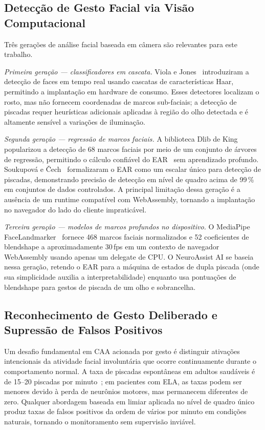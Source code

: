 \subsection{Detecção de Gesto Facial via Visão Computacional}

Três gerações de análise facial baseada em câmera são relevantes para este trabalho.

\emph{Primeira geração — classificadores em cascata.} Viola e Jones~\cite{violajones2004}
introduziram a detecção de faces em tempo real usando cascatas de características Haar,
permitindo a implantação em hardware de consumo. Esses detectores localizam o rosto,
mas não fornecem coordenadas de marcos sub-faciais; a detecção de piscadas requer
heurísticas adicionais aplicadas à região do olho detectada e é altamente sensível a
variações de iluminação.

\emph{Segunda geração — regressão de marcos faciais.} A biblioteca Dlib de King~\cite{king2009dlib}
popularizou a detecção de 68 marcos faciais por meio de um conjunto de árvores de
regressão, permitindo o cálculo confiável do EAR~\cite{soukupova2016} sem aprendizado
profundo. Soukupová e Čech~\cite{soukupova2016} formalizaram o EAR como um escalar
único para detecção de piscadas, demonstrando precisão de detecção em nível de quadro
acima de 99\,\% em conjuntos de dados controlados. A principal limitação dessa geração
é a ausência de um runtime compatível com WebAssembly, tornando a implantação no
navegador do lado do cliente impraticável.

\emph{Terceira geração — modelos de marcos profundos no dispositivo.} O MediaPipe
FaceLandmarker~\cite{lugaresi2019mediapipe} fornece 468 marcos faciais normalizados e
52 coeficientes de blendshape a aproximadamente 30\,fps em um contexto de navegador
WebAssembly usando apenas um delegate de CPU. O NeuroAssist AI se baseia nessa
geração, retendo o EAR para a máquina de estados de dupla piscada (onde sua
simplicidade auxilia a interpretabilidade) enquanto usa pontuações de blendshape para
gestos de piscada de um olho e sobrancelha.

\subsection{Reconhecimento de Gesto Deliberado e Supressão de Falsos Positivos}

Um desafio fundamental em CAA acionada por gesto é distinguir ativações intencionais
da atividade facial involuntária que ocorre continuamente durante o comportamento normal.
A taxa de piscadas espontâneas em adultos saudáveis é de 15--20 piscadas por
minuto~\cite{bentivoglio1997}; em pacientes com ELA, as taxas podem ser menores devido
à perda de neurônios motores, mas permanecem diferentes de zero. Qualquer abordagem
baseada em limiar aplicada no nível de quadro único produz taxas de falsos positivos
da ordem de vários por minuto em condições naturais, tornando o monitoramento sem
supervisão inviável.

